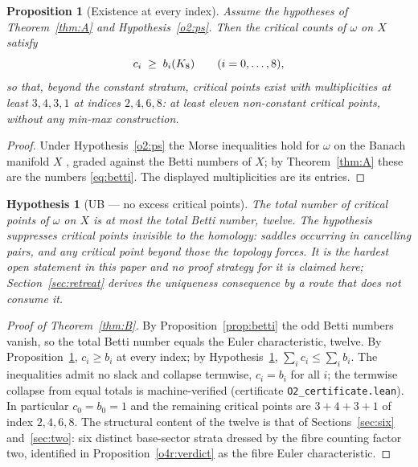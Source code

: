 \documentclass[11pt]{article}
\numberwithin{equation}{section}
\theoremstyle{plain}
\newtheorem{proposition}[theorem]{Proposition}
\newtheorem{hypothesis}[theorem]{Hypothesis}
\theoremstyle{definition}
\theoremstyle{remark}
\begin{document}
\begin{proposition}[Existence at every index]\label{o2:exist}
Assume the hypotheses of Theorem~\textup{\ref{thm:A}} and
Hypothesis~\textup{\ref{o2:ps}}. Then the critical counts of
$\omega$ on $X$ satisfy
\[
c_{i} \;\geq\; b_{i}(K_8)
\qquad (i = 0, \dots, 8),
\]
so that, beyond the constant stratum, critical points exist with
multiplicities at least $3, 4, 3, 1$ at indices $2, 4, 6, 8$: at
least eleven non-constant critical points, without any min-max
construction.
\end{proposition}

\begin{proof}
Under Hypothesis~\ref{o2:ps} the Morse inequalities hold for
$\omega$ on the Banach manifold $X$
\cite{Palais1963, Milnor1963}, graded against the Betti numbers of
$X$; by Theorem~\ref{thm:A} these are the numbers
\eqref{eq:betti}. The displayed multiplicities are its entries.
\end{proof}

\begin{hypothesis}[UB --- no excess critical
points]\label{hyp:ub}
The total number of critical points of $\omega$ on $X$ is at most
the total Betti number, twelve. The hypothesis suppresses critical
points invisible to the homology: saddles occurring in cancelling
pairs, and any critical point beyond those the topology forces. It
is the hardest open statement in this paper and no proof strategy
for it is claimed here; Section~\ref{sec:retreat} derives the
uniqueness consequence by a route that does not consume it.
\end{hypothesis}

\begin{proof}[Proof of Theorem~\textup{\ref{thm:B}}]
By Proposition~\ref{prop:betti} the odd Betti numbers vanish, so
the total Betti number equals the Euler characteristic, twelve. By
Proposition~\ref{o2:exist}, $c_{i} \geq b_{i}$ at every index; by
Hypothesis~\ref{hyp:ub}, $\sum_{i} c_{i} \leq \sum_{i} b_{i}$. The
inequalities admit no slack and collapse termwise, $c_{i} = b_{i}$
for all $i$; the termwise collapse from equal totals is
machine-verified (certificate \texttt{O2\_certificate.lean}). In
particular $c_{0} = b_{0} = 1$ and the remaining critical points
are $3 + 4 + 3 + 1$ of index $2, 4, 6, 8$. The structural content
of the twelve is that of Sections~\ref{sec:six} and~\ref{sec:two}:
six distinct base-sector strata dressed by the fibre counting
factor two, identified in Proposition~\ref{o4r:verdict} as the
fibre Euler characteristic.
\end{proof}
\end{document}
